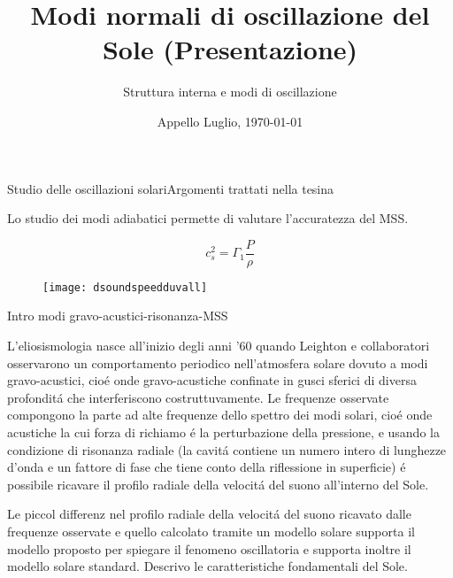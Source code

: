 \documentclass[10pt,xcolor={usenames},fleqn,mathserif,serif]{beamer}
\title{Modi normali di oscillazione del Sole (Presentazione)}
\subtitle{Struttura interna e modi di oscillazione}
\date{Appello Luglio, \today}
\begin{document}
\begin{frame}
  \titlepage
\end{frame}



\begin{frame}[label={intro}]{Studio delle oscillazioni solari}{Argomenti trattati nella tesina}

Lo studio dei modi adiabatici permette di valutare l'accuratezza del MSS.

\begin{equation*}
c_s^2=\Gamma_1\frac{P}{\rho}
\end{equation*}

\begin{figure}[!ht]
\texttt{[image: dsoundspeedduvall]} 

\label{dsoundduvall}
\end{figure}

\end{frame}

\begin{wordonframe}{Intro modi gravo-acustici-risonanza-MSS}

L'eliosismologia nasce all'inizio degli anni '60 quando Leighton e collaboratori osservarono un comportamento periodico nell'atmosfera solare dovuto a modi gravo-acustici, cio\'e onde gravo-acustiche confinate in gusci sferici di diversa profondit\'a che interferiscono costruttuvamente. %
Le frequenze osservate compongono la parte ad alte frequenze dello spettro dei modi solari, cio\'e onde acustiche la cui forza di richiamo \'e la perturbazione della pressione, e usando la condizione di risonanza radiale (la cavit\'a contiene un numero intero di lunghezze d'onda e un fattore di fase che tiene conto della riflessione in superficie) \'e possibile ricavare il profilo radiale della velocit\'a del suono all'interno del Sole.

Le piccol differenz nel profilo radiale della velocit\'a del suono ricavato dalle frequenze osservate e quello calcolato tramite un modello solare supporta il modello proposto per spiegare il fenomeno oscillatoria e supporta inoltre il modello solare standard. Descrivo le caratteristiche fondamentali del Sole.


\end{wordonframe}
\end{document}
